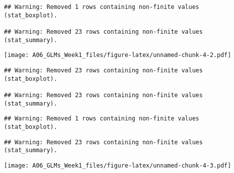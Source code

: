 \documentclass[
]{article}
\newenvironment{Shaded}{\begin{snugshade}}{\end{snugshade}}
\newcommand{\CommentTok}[1]{\textcolor[rgb]{0.56,0.35,0.01}{\textit{#1}}}
\newcommand{\DataTypeTok}[1]{\textcolor[rgb]{0.13,0.29,0.53}{#1}}
\newcommand{\DecValTok}[1]{\textcolor[rgb]{0.00,0.00,0.81}{#1}}
\newcommand{\FloatTok}[1]{\textcolor[rgb]{0.00,0.00,0.81}{#1}}
\newcommand{\KeywordTok}[1]{\textcolor[rgb]{0.13,0.29,0.53}{\textbf{#1}}}
\newcommand{\NormalTok}[1]{#1}
\newcommand{\OperatorTok}[1]{\textcolor[rgb]{0.81,0.36,0.00}{\textbf{#1}}}
\newcommand{\StringTok}[1]{\textcolor[rgb]{0.31,0.60,0.02}{#1}}
\begin{document}
\begin{verbatim}
## Warning: Removed 1 rows containing non-finite values (stat_boxplot).

## Warning: Removed 23 rows containing non-finite values (stat_summary).
\end{verbatim}

\texttt{[image: A06\_GLMs\_Week1\_files/figure-latex/unnamed-chunk-4-2.pdf]}

\begin{Shaded}
\end{Shaded}

\begin{verbatim}
## Warning: Removed 23 rows containing non-finite values (stat_boxplot).

## Warning: Removed 23 rows containing non-finite values (stat_summary).
\end{verbatim}

\begin{verbatim}
## Warning: Removed 1 rows containing non-finite values (stat_boxplot).
\end{verbatim}

\begin{verbatim}
## Warning: Removed 23 rows containing non-finite values (stat_summary).
\end{verbatim}

\texttt{[image: A06\_GLMs\_Week1\_files/figure-latex/unnamed-chunk-4-3.pdf]}
\end{document}
